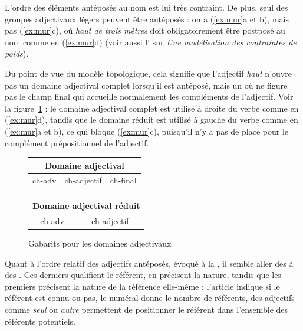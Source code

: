 {    L’ordre des éléments antéposés au nom est lui très contraint. De plus, seul des groupes adjectivaux légers peuvent être antéposés :
    on a (\ref{ex:mur}a et b), mais pas (\ref{ex:mur}c), où \textit{haut de trois mètres} doit obligatoirement être postposé au nom comme en (\ref{ex:mur}d)
    (voir aussi l’ sur \textit{Une modélisation des contraintes de poids}). 
    
    \ea\label{ex:mur}
    \z
    \z
    Du point de vue du modèle topologique, cela signifie que l’adjectif \textit{haut} n’ouvre pas un domaine adjectival complet lorsqu’il est antéposé, mais un  où ne figure pas le champ final qui accueille normalement les compléments de l’adjectif. Voir la figure~\ref{fig:domaine-adj} : le domaine adjectival complet est utilisé à droite du verbe comme en (\ref{ex:mur}d), tandis que le domaine réduit est utilisé à gauche du verbe comme en (\ref{ex:mur}a et b), ce qui bloque (\ref{ex:mur}c), puisqu'il n'y a pas de place pour le complément prépositionnel de l'adjectif.
    
\begin{figure}[H]
    \caption{Gabarits pour les domaines adjectivaux}
    \label{fig:domaine-adj}
        \begin{center}
    \def\arraystretch{1.5}
    \setlength{\tabcolsep}{4ex}
    \begin{tabular}{|c|c|c|}
    \hline
    \multicolumn{3}{|c|}{\cellcolor{lsDOIGray}Domaine adjectival}\\\hline
    ch-adv & \cellcolor{lsDOIGray} ch-adjectif & ch-final\\
    \hline
    \end{tabular}
    \end{center}
   \begin{center}
    \def\arraystretch{1.5}
    \setlength{\tabcolsep}{4ex}
    \begin{tabular}{|c|c|}
    \hline
    \multicolumn{2}{|c|}{\cellcolor{lsDOIGray}Domaine adjectival réduit}\\\hline
    ch-adv & \cellcolor{lsDOIGray}ch-adjectif\\
    \hline
    \end{tabular}
    \end{center}
\end{figure}

Quant à l’ordre relatif des adjectifs antéposés, évoqué à la , il semble aller des  à des . Ces derniers qualifient le référent, en précisent la nature, tandis que les premiers précisent la nature de la référence elle-même : l’article indique si le référent est connu ou pas, le numéral donne le nombre de référents, des adjectifs comme \textit{seul} ou \textit{autre} permettent de positionner le référent dans l’ensemble des référents potentiels.
}
